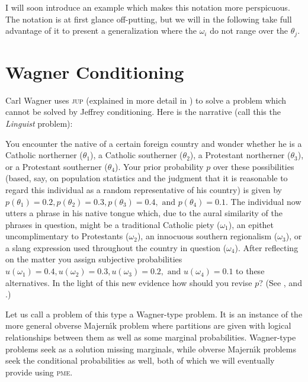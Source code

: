 \documentclass[11pt]{article}
\begin{document}
I will soon introduce an example which makes this notation more
perspicuous. The notation is at first glance off-putting, but we will
in the following take full advantage of it to present a generalization
where the $\omega_{i}$ do not range over the $\theta_{j}$.

\section{Wagner Conditioning}
\label{wc}

Carl Wagner uses \textsc{jup} (explained in more detail in
) to solve a problem which cannot be solved by
Jeffrey conditioning. Here is the narrative (call this the
\emph{Linguist} problem):

\begin{quotex}
  You encounter the native of a certain foreign country and wonder
  whether he is a Catholic northerner ($\theta_{1}$), a Catholic
  southerner ($\theta_{2}$), a Protestant northerner ($\theta_{3}$),
  or a Protestant southerner ($\theta_{4}$). Your prior probability
  $p$ over these possibilities (based, say, on population statistics
  and the judgment that it is reasonable to regard this individual as
  a random representative of his country) is given by
  $p(\theta_{1})=0.2,p(\theta_{2})=0.3,p(\theta_{3})=0.4,\mbox{ and
  }p(\theta_{4})=0.1$. The individual now utters a phrase in his
  native tongue which, due to the aural similarity of the phrases in
  question, might be a traditional Catholic piety ($\omega_{1}$), an
  epithet uncomplimentary to Protestants ($\omega_{2}$), an innocuous
  southern regionalism ($\omega_{3}$), or a slang expression used
  throughout the country in question ($\omega_{4}$). After reflecting
  on the matter you assign subjective probabilities
  $u(\omega_{1})=0.4,u(\omega_{2})=0.3,u(\omega_{3})=0.2,\mbox{ and
  }u(\omega_{4})=0.1$ to these alternatives. In the light of this new
  evidence how should you revise $p$? (See ,
  and .)
\end{quotex}

Let us call a problem of this type a Wagner-type problem. It is an
instance of the more general obverse Majern{\'\i}k problem where partitions
are given with logical relationships between them as well as some
marginal probabilities. Wagner-type problems seek as a solution
missing marginals, while obverse Majern{\'\i}k problems seek the
conditional probabilities as well, both of which we will eventually
provide using \textsc{pme}.
\end{document}
